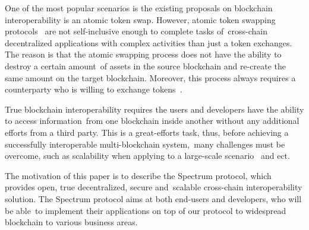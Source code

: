 One of the most popular scenarios is the existing proposals on blockchain interoperability is an atomic token swap.
However, atomic token swapping protocols~\cite{Miraz2019} are not self-inclusive enough to complete tasks of\
cross-chain decentralized applications with complex activities than just a token exchanges.
The reason is that the atomic swapping process does not have the ability to destroy a certain amount\
of assets in the source blockchain and re-create the same amount on the target blockchain.
Moreover, this process always requires a counterparty who is willing to exchange tokens~\cite{Schulte2019TowardsBI}.

True blockchain interoperability requires the users and developers have the ability to access information\
from one blockchain inside another without any additional efforts from a third party.
This is a great-efforts task, thus, before achieving a successfully interoperable multi-blockchain system,\
many challenges must be overcome, such as scalability when applying to a large-scale scenario~\cite{Kim2018} and ect.

The motivation of this paper is to describe the Spectrum protocol, which provides open, true decentralized, secure and\
scalable cross-chain interoperability solution.
The Spectrum protocol aims at both end-users and developers, who will be able\
to implement their applications on top of our protocol to widespread blockchain to various business areas.
